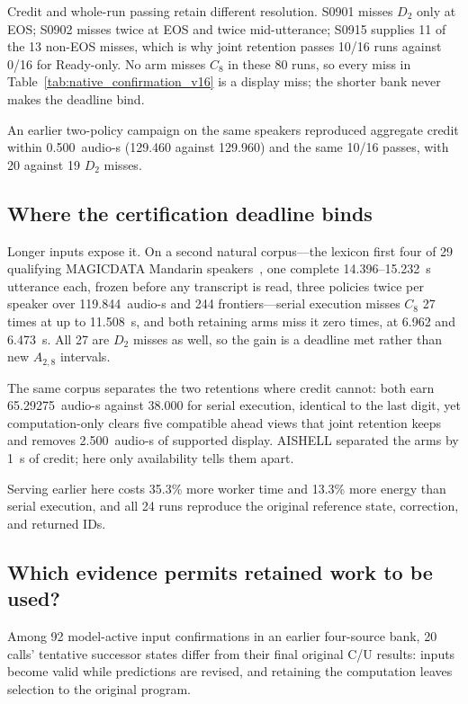 

Credit and whole-run passing retain different resolution. S0901 misses
$D_2$ only at EOS; S0902 misses twice at EOS and twice mid-utterance;
S0915 supplies 11 of the 13 non-EOS misses, which is why joint retention
passes 10/16 runs against 0/16 for Ready-only. No arm misses $C_8$ in
these 80 runs, so every miss in Table~\ref{tab:native_confirmation_v16}
is a display miss; the shorter bank never makes the deadline bind.



An earlier two-policy campaign on the same speakers reproduced aggregate
credit within 0.500~audio-s (129.460 against 129.960) and the same 10/16
passes, with 20 against 19 $D_2$ misses.

\subsection{Where the certification deadline binds}

Longer inputs expose it. On a second natural corpus---the lexicon first
four of 29 qualifying MAGICDATA Mandarin speakers~\cite{magicdata68},
one complete 14.396--15.232~s utterance each, frozen before any
transcript is read, three policies twice per speaker over 119.844~audio-s
and 244 frontiers---serial execution misses $C_8$ 27 times at up to
11.508~s, and both retaining arms miss it zero times, at 6.962 and
6.473~s. All 27 are $D_2$ misses as well, so the gain is a deadline met
rather than new $A_{2,8}$ intervals.

The same corpus separates the two retentions where credit cannot: both
earn 65.29275~audio-s against 38.000 for serial execution, identical to
the last digit, yet computation-only clears five compatible ahead views
that joint retention keeps and removes 2.500~audio-s of supported
display. AISHELL separated the arms by 1~s of credit; here only
availability tells them apart.

Serving earlier here costs 35.3\% more worker time and 13.3\% more
energy than serial execution, and all 24 runs reproduce the original
reference state, correction, and returned IDs.

\subsection{Which evidence permits retained work to be used?}
Among 92 model-active input confirmations in an earlier four-source
bank, 20 calls' tentative successor states differ from their final
original C/U results: inputs become valid while predictions are revised,
and retaining the computation leaves selection to the original program.

